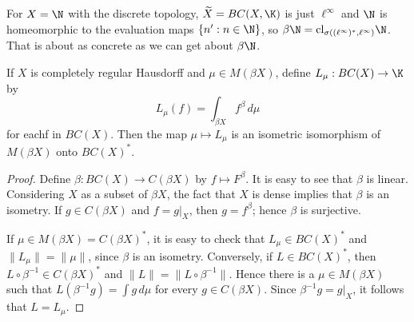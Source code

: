 \begin{example}
For $X=\N$ with the discrete topology, $\widetilde{X}=BC(X,\K)$ is just $\ell^\infty$ and $\N$ is homeomorphic to the evaluation maps $\{n':n\in\N\}$, so $\beta\N=\mathrm{cl}_{\sigma((\ell^\infty)^*,\ell^\infty)}\N$. That is about as concrete as we can get about $\beta\N$.
\end{example}
\begin{corollary}\label{completely regulat dual of BC(X) char}
If $X$ is completely regular Hausdorff and $\mu\in M(\beta X)$, define $L_\mu:BC(X)\to\K$ by
\[L_\mu(f)=\int_{\beta X}f^\beta\,d\mu\]
for eachf in $BC(X)$. Then the map $\mu\mapsto L_\mu$ is an isometric isomorphism of $M(\beta X)$ onto $BC(X)^*$.
\end{corollary}
\begin{proof}
Define $\beta:BC(X)\to C(\beta X)$ by $f\mapsto F^\beta$. It is easy to see that $\beta$ is linear. Considering $X$ as a subset of $\beta X$, the fact that $X$ is dense implies that $\beta$ is an isometry. If $g\in C(\beta X)$ and $f=g|_X$, then $g=f^\beta$; hence $\beta$ is surjective.\par
If $\mu\in M(\beta X)=C(\beta X)^*$, it is easy to check that $L_\mu\in BC(X)^*$ and $\|L_\mu\|=\|\mu\|$, since $\beta$ is an isometry. Conversely, if $L\in BC(X)^*$, then $L\circ\beta^{-1}\in C(\beta X)^*$ and $\|L\|=\|L\circ\beta^{-1}\|$. Hence there is a $\mu\in M(\beta X)$ such that $L(\beta^{-1}g)=\int g\,d\mu$ for every $g\in C(\beta X)$. Since $\beta^{-1}g=g|_X$, it follows that $L=L_\mu$.
\end{proof}
